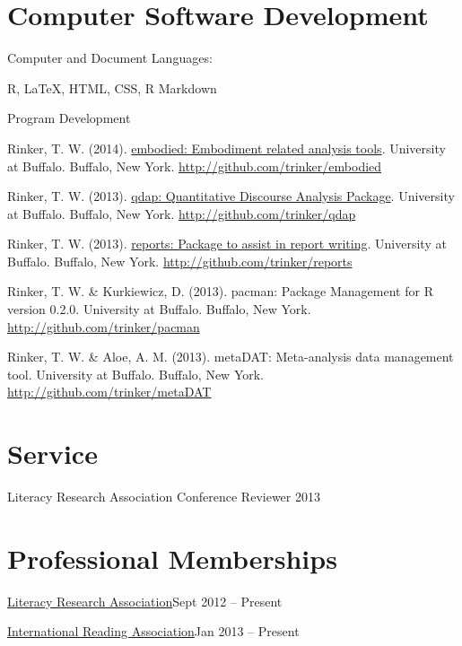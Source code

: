 \section{Computer Software Development}
Computer and Document Languages:
%
\begin{innerlist}
    \item R, \LaTeX, HTML, CSS, R Markdown
\end{innerlist}

\halfblankline

Program Development
\begin{innerlist}
    \item Rinker, T. W. (2014). \href{http://github.com/trinker/embodied}{embodied: Embodiment related analysis tools}.  University at Buffalo. Buffalo, New York. \url{http://github.com/trinker/embodied}
    \item Rinker, T. W. (2013). \href{http://cran.r-project.org/web/packages/qdap/index.html}{qdap: Quantitative Discourse Analysis Package}. University at Buffalo. Buffalo, New York. \url{http://github.com/trinker/qdap}
    \item Rinker, T. W. (2013). \href{http://cran.r-project.org/web/packages/reports/index.html}{reports: Package to assist in report writing}. University at Buffalo. Buffalo, New York. \url{http://github.com/trinker/reports}
    \item Rinker, T. W. \& Kurkiewicz, D. (2013). pacman: Package Management for R version 0.2.0. University at Buffalo. Buffalo, New York. \url{http://github.com/trinker/pacman}
    \item Rinker, T. W. \& Aloe, A. M. (2013). metaDAT: Meta-analysis data management tool.  University at Buffalo. Buffalo, New York. \\ \url{http://github.com/trinker/metaDAT}
\end{innerlist}

\section{Service}

\begin{innerlist}
    \item Literacy Research Association Conference Reviewer \hfill {2013}
\end{innerlist}



\section{Professional Memberships}
\begin{innerlist}
    \item \href{http://www.literacyresearchassociation.org/}{Literacy Research Association}\hfill {Sept 2012 -- Present}
    \item \href{http://www.reading.org/}{International Reading Association}\hfill {Jan 2013 -- Present}
\end{innerlist}


